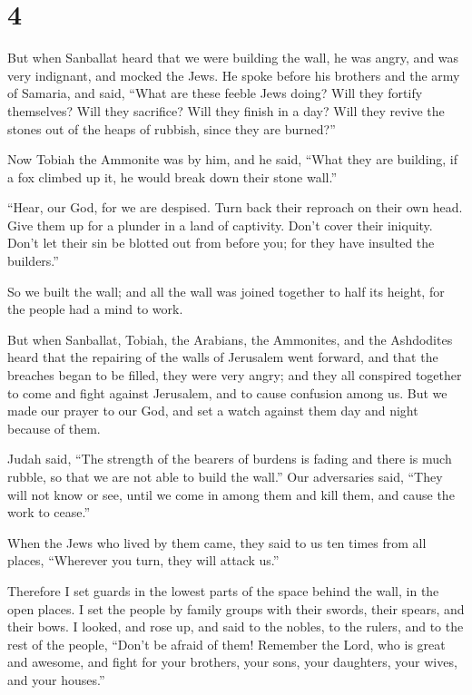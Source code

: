 \hypertarget{section-3}{%
\section{4}\label{section-3}}

 But when Sanballat heard that we were building the wall, he
was angry, and was very indignant, and mocked the Jews.  He
spoke before his brothers and the army of Samaria, and said, ``What are
these feeble Jews doing? Will they fortify themselves? Will they
sacrifice? Will they finish in a day? Will they revive the stones out of
the heaps of rubbish, since they are burned?''

 Now Tobiah the Ammonite was by him, and he said, ``What
they are building, if a fox climbed up it, he would break down their
stone wall.''

 ``Hear, our God, for we are despised. Turn back their
reproach on their own head. Give them up for a plunder in a land of
captivity.  Don't cover their iniquity. Don't let their sin
be blotted out from before you; for they have insulted the builders.''

 So we built the wall; and all the wall was joined together
to half its height, for the people had a mind to work.

 But when Sanballat, Tobiah, the Arabians, the Ammonites,
and the Ashdodites heard that the repairing of the walls of Jerusalem
went forward, and that the breaches began to be filled, they were very
angry;  and they all conspired together to come and fight
against Jerusalem, and to cause confusion among us.  But we
made our prayer to our God, and set a watch against them day and night
because of them.

 Judah said, ``The strength of the bearers of burdens is
fading and there is much rubble, so that we are not able to build the
wall.''  Our adversaries said, ``They will not know or see,
until we come in among them and kill them, and cause the work to
cease.''

 When the Jews who lived by them came, they said to us ten
times from all places, ``Wherever you turn, they will attack us.''

 Therefore I set guards in the lowest parts of the space
behind the wall, in the open places. I set the people by family groups
with their swords, their spears, and their bows.  I looked,
and rose up, and said to the nobles, to the rulers, and to the rest of
the people, ``Don't be afraid of them! Remember the Lord, who is great
and awesome, and fight for your brothers, your sons, your daughters,
your wives, and your houses.''

